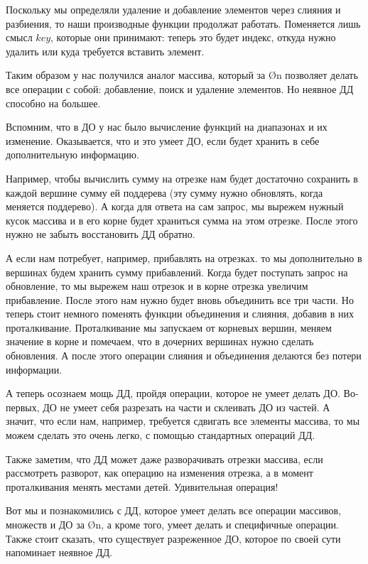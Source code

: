 Поскольку мы определяли удаление и добавление элементов через слияния и разбиения, то наши производные функции продолжат работать. Поменяется лишь смысл $key$, которые они принимают: теперь это будет индекс, откуда нужно удалить или куда требуется вставить элемент.

Таким образом у нас получился аналог массива, который за \O{\log n} позволяет делать все операции с собой: добавление, поиск и удаление элементов. Но неявное ДД способно на большее.

Вспомним, что в ДО у нас было вычисление функций на диапазонах и их изменение. Оказывается, что и это умеет ДО, если будет хранить в себе дополнительную информацию.

Например, чтобы вычислить сумму на отрезке нам будет достаточно сохранить в каждой вершине сумму ей поддерева (эту сумму нужно обновлять, когда меняется поддерево). А когда для ответа на сам запрос, мы вырежем нужный кусок массива и в его корне будет храниться сумма на этом отрезке. После этого нужно не забыть восстановить ДД обратно.

А если нам потребует, например, прибавлять на отрезках. то мы дополнительно в вершинах будем хранить сумму прибавлений. Когда будет поступать запрос на обновление, то мы вырежем наш отрезок и в корне отрезка увеличим прибавление. После этого нам нужно будет вновь объединить все три части. Но теперь стоит немного поменять функции объединения и слияния, добавив в них проталкивание. Проталкивание мы запускаем от корневых вершин, меняем значение в корне и помечаем, что в дочерних вершинах нужно сделать обновления. А после этого операции слияния и объединения делаются без потери информации.

А теперь осознаем мощь ДД, пройдя операции, которое не умеет делать ДО. Во-первых, ДО не умеет себя разрезать на части и склеивать ДО из частей. А значит, что если нам, например, требуется сдвигать все элементы массива, то мы можем сделать это очень легко, с помощью стандартных операций ДД.

Также заметим, что ДД может даже разворачивать отрезки массива, если рассмотреть разворот, как операцию на изменения отрезка, а в момент проталкивания менять местами детей. Удивительная операция!

Вот мы и познакомились с ДД, которое умеет делать все операции массивов, множеств и ДО за \O{\log n}, а кроме того, умеет делать и специфичные операции. Также стоит сказать, что существует разреженное ДО, которое по своей сути напоминает неявное ДД.

